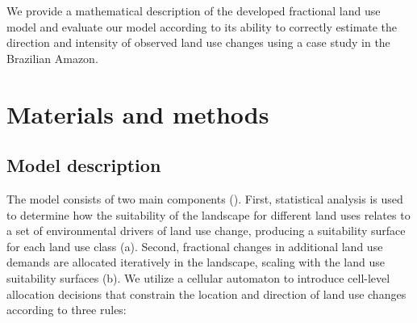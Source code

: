 \documentclass[titlesmallcaps,copyrightpage]{uomthesis}\usepackage[]{graphicx}\usepackage[]{color}
\begin{document}
We provide a mathematical description of the developed fractional land
use model and evaluate our model according to its ability to correctly
estimate the direction and intensity of observed land use changes using
a case study in the Brazilian Amazon.

\section{Materials and methods}

\subsection{Model description}

The model consists of two main components ().
First, statistical analysis is used to determine how the suitability of
the landscape for different land uses relates to a set of environmental
drivers of land use change, producing a suitability surface for each
land use class (a). Second, fractional changes
in additional land use demands are allocated iteratively in the
landscape, scaling with the land use suitability surfaces (b). We utilize a cellular automaton to introduce
cell-level allocation decisions that constrain the location and
direction of land use changes according to three rules:
\end{document}
